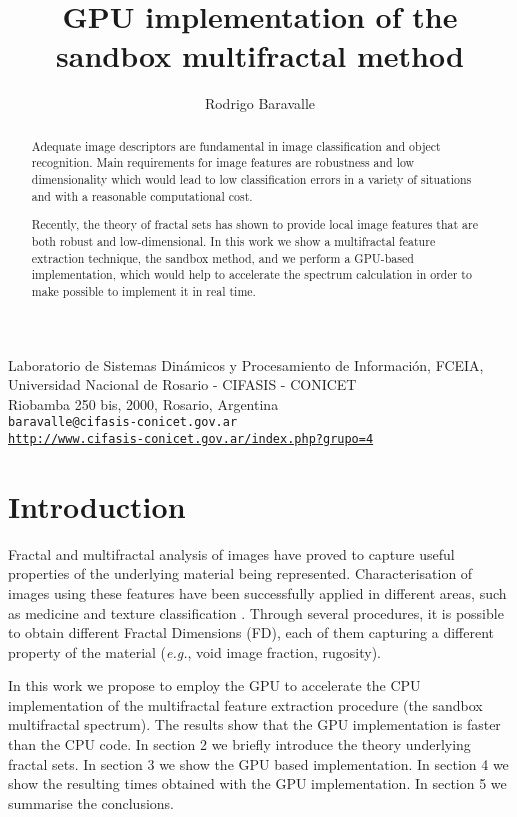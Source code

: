 \documentclass[oneside,a4paper,english,links]{article}
\title{GPU implementation of the sandbox multifractal method}
\author{Rodrigo Baravalle}
\begin{document}
\maketitle
\begin{center}
\small{Laboratorio de Sistemas Din\'amicos y Procesamiento de Informaci\'on, FCEIA, Universidad Nacional de Rosario - CIFASIS - CONICET}\\
\small{Riobamba 250 bis, 2000, Rosario, Argentina}\\

\texttt{baravalle@cifasis-conicet.gov.ar}\\
\texttt{\url{http://www.cifasis-conicet.gov.ar/index.php?grupo=4}}
\end{center}

\begin{abstract}
Adequate image descriptors are fundamental in image classification and object recognition. Main requirements for image features are robustness and low dimensionality which would lead to low classification errors in a variety of situations and with a reasonable computational cost. 

Recently, the theory of fractal sets has shown to provide local image features that are both robust and low-dimensional. In this work we show a multifractal feature extraction technique, the sandbox method, and we perform a GPU-based implementation, which would help to accelerate the spectrum calculation in order to make possible to implement it in real time.
\end{abstract}

\section{Introduction}
Fractal and multifractal analysis of images have proved to capture useful properties of the underlying material being represented. Characterisation of images using these features have been successfully applied in different areas, such as medicine \cite{Andjelkovic2008,Yu2011} and texture classification \cite{Wendt2009}. Through several procedures, it is possible to obtain different Fractal Dimensions (FD), each of them capturing a different property of the material ({\em e.g.}, void image fraction, rugosity).

In this work we propose to employ the GPU to accelerate the CPU implementation of the multifractal feature extraction procedure (the sandbox multifractal spectrum). The results show that the GPU implementation is faster than the CPU code. In section 2 we briefly introduce the theory underlying fractal sets. In section 3 we show the GPU based implementation. In section 4 we show the resulting times obtained with the GPU implementation. In section 5 we summarise the conclusions.
\end{document}

